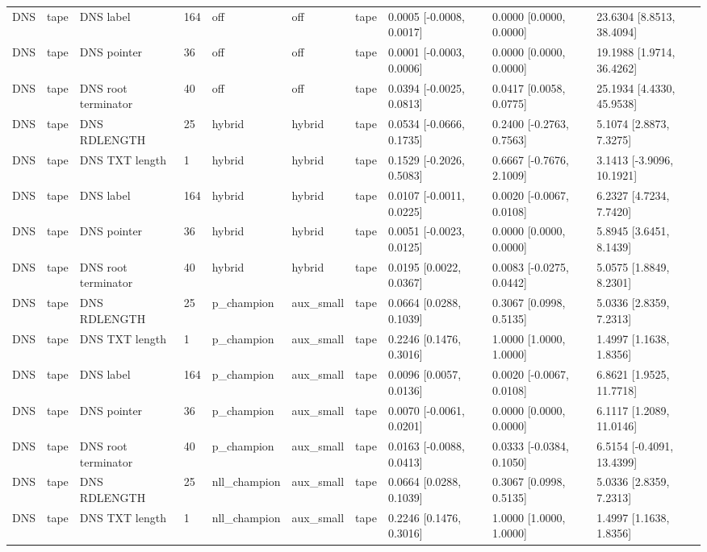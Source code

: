 \begin{tabular}{llllllllll}
DNS & tape & DNS label & 164 & off & off & tape & 0.0005 [-0.0008, 0.0017] & 0.0000 [0.0000, 0.0000] & 23.6304 [8.8513, 38.4094] \\
DNS & tape & DNS pointer & 36 & off & off & tape & 0.0001 [-0.0003, 0.0006] & 0.0000 [0.0000, 0.0000] & 19.1988 [1.9714, 36.4262] \\
DNS & tape & DNS root terminator & 40 & off & off & tape & 0.0394 [-0.0025, 0.0813] & 0.0417 [0.0058, 0.0775] & 25.1934 [4.4330, 45.9538] \\
DNS & tape & DNS RDLENGTH & 25 & hybrid & hybrid & tape & 0.0534 [-0.0666, 0.1735] & 0.2400 [-0.2763, 0.7563] & 5.1074 [2.8873, 7.3275] \\
DNS & tape & DNS TXT length & 1 & hybrid & hybrid & tape & 0.1529 [-0.2026, 0.5083] & 0.6667 [-0.7676, 2.1009] & 3.1413 [-3.9096, 10.1921] \\
DNS & tape & DNS label & 164 & hybrid & hybrid & tape & 0.0107 [-0.0011, 0.0225] & 0.0020 [-0.0067, 0.0108] & 6.2327 [4.7234, 7.7420] \\
DNS & tape & DNS pointer & 36 & hybrid & hybrid & tape & 0.0051 [-0.0023, 0.0125] & 0.0000 [0.0000, 0.0000] & 5.8945 [3.6451, 8.1439] \\
DNS & tape & DNS root terminator & 40 & hybrid & hybrid & tape & 0.0195 [0.0022, 0.0367] & 0.0083 [-0.0275, 0.0442] & 5.0575 [1.8849, 8.2301] \\
DNS & tape & DNS RDLENGTH & 25 & p\_champion & aux\_small & tape & 0.0664 [0.0288, 0.1039] & 0.3067 [0.0998, 0.5135] & 5.0336 [2.8359, 7.2313] \\
DNS & tape & DNS TXT length & 1 & p\_champion & aux\_small & tape & 0.2246 [0.1476, 0.3016] & 1.0000 [1.0000, 1.0000] & 1.4997 [1.1638, 1.8356] \\
DNS & tape & DNS label & 164 & p\_champion & aux\_small & tape & 0.0096 [0.0057, 0.0136] & 0.0020 [-0.0067, 0.0108] & 6.8621 [1.9525, 11.7718] \\
DNS & tape & DNS pointer & 36 & p\_champion & aux\_small & tape & 0.0070 [-0.0061, 0.0201] & 0.0000 [0.0000, 0.0000] & 6.1117 [1.2089, 11.0146] \\
DNS & tape & DNS root terminator & 40 & p\_champion & aux\_small & tape & 0.0163 [-0.0088, 0.0413] & 0.0333 [-0.0384, 0.1050] & 6.5154 [-0.4091, 13.4399] \\
DNS & tape & DNS RDLENGTH & 25 & nll\_champion & aux\_small & tape & 0.0664 [0.0288, 0.1039] & 0.3067 [0.0998, 0.5135] & 5.0336 [2.8359, 7.2313] \\
DNS & tape & DNS TXT length & 1 & nll\_champion & aux\_small & tape & 0.2246 [0.1476, 0.3016] & 1.0000 [1.0000, 1.0000] & 1.4997 [1.1638, 1.8356] \\

\end{tabular}
